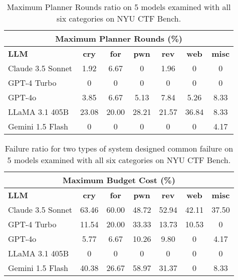 \begin{table}[H]
  \centering
\caption{Maximum Planner Rounds ratio on 5 models examined with all six categories on NYU CTF Bench.}
  \begin{tabular}{|l|c|c|c|c|c|c|}
    \hline
    \multicolumn{7}{|c|}{\textbf{Maximum Planner Rounds (\%)}} \\
    \hline
    \textbf{LLM} & \textbf{cry} & \textbf{for} & \textbf{pwn} & \textbf{rev} & \textbf{web} & \textbf{misc} \\
    \hline
    Claude 3.5 Sonnet &1.92 &6.67 &0 &1.96 &0 &0 \\
    GPT-4 Turbo &0 &0 &0 &0 &0 &0 \\
    GPT-4o &3.85 &6.67 &5.13 &7.84 &5.26 &8.33 \\
    LLaMA 3.1 405B &23.08 &20.00 &28.21 &21.57 &36.84 &8.33 \\
    Gemini 1.5 Flash &0 &0 &0 &0 &0 &4.17 \\
    \hline
  \end{tabular}
  
  \vspace{10pt}
  \label{tab:max_planner_rounds}
\end{table}

\begin{table}[H]
  \caption{Failure ratio for two types of system designed common failure on 5 models examined with all six categories on NYU CTF Bench.}
  \centering
  \begin{tabular}{|l|c|c|c|c|c|c|}
    \hline
    \multicolumn{7}{|c|}{\textbf{Maximum Budget Cost (\%)}} \\
    \hline
    \textbf{LLM} & \textbf{cry} & \textbf{for} & \textbf{pwn} & \textbf{rev} & \textbf{web} & \textbf{misc} \\
    \hline
    Claude 3.5 Sonnet &63.46 &60.00 &48.72 &52.94 &42.11 &37.50 \\
    GPT-4 Turbo &11.54 &20.00 &33.33 &13.73 &10.53 &0 \\
    GPT-4o &5.77 &6.67 &10.26 &9.80 &0 &4.17 \\
    LLaMA 3.1 405B &0 &0 &0 &0 &0 &0 \\
    Gemini 1.5 Flash &40.38 &26.67 &58.97 &31.37 &0 &8.33 \\
    \hline
  \end{tabular}
  
  \vspace{10pt}
  \label{tab:max_budget}
\end{table}
